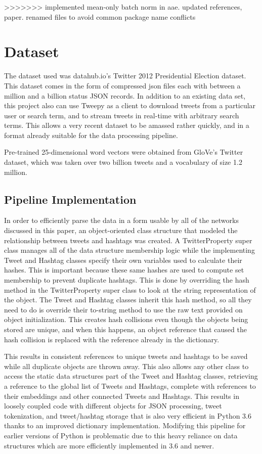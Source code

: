 \documentclass{article}
\begin{document}
>>>>>>> implemented mean-only batch norm in aae. updated references, paper. renamed files to avoid common package name conflicts

\section{Dataset}
	The dataset used was datahub.io's Twitter 2012 Presidential Election dataset. This
	dataset comes in the form of compressed json files each with between a million and
	a billion status JSON records. In addition to an existing data set, this project
	also can use Tweepy as a client to download tweets from a particular user or search term,
	and to stream tweets in real-time with arbitrary search terms. This allows a
	very recent dataset to be amassed rather quickly, and in a format already suitable
	for the data processing pipeline.

	Pre-trained 25-dimensional word vectors were obtained from GloVe's Twitter dataset,
	which was taken over two billion tweets and a vocabulary of size 1.2 million.

	\subsection{Pipeline Implementation}
		In order to efficiently parse the data in a form usable by all of the networks discussed
		in this paper, an object-oriented class structure that modeled the relationship between tweets and
		hashtags was created. A TwitterProperty super class manages all of the data structure
		membership logic while the implementing Tweet and Hashtag classes specify
		their own variables used to calculate their hashes. This is important because
		these same hashes are used to compute set membership to prevent duplicate hashtags.
		This is done by overriding the hash method in the TwitterProperty super class to
		look at the string representation of the object. The Tweet and Hashtag classes
		inherit this hash method, so all they need to do is override their to-string method
		to use the raw text provided on object initialization. This creates hash collisions
		even though the objects being stored are unique, and when this happens, an object
		reference that caused the hash collision is replaced with the reference already in the dictionary.

		This results in consistent references to unique tweets and hashtags to be saved
		while all duplicate objects are thrown away. This also allows any other class
		to access the static data structures part of the Tweet and Hashtag classes, retrieving
		a reference to the global list of Tweets and Hashtags, complete with references
		to their embeddings and other connected Tweets and Hashtags. This results in
		loosely coupled code with different objects for JSON processing, tweet tokenization,
		and tweet/hashtag storage that is also very efficient in Python 3.6 thanks to
		an improved dictionary implementation. Modifying this pipeline for earlier
		versions of Python is problematic due to this heavy reliance on data structures
		which are more efficiently implemented in 3.6 and newer.
\end{document}
